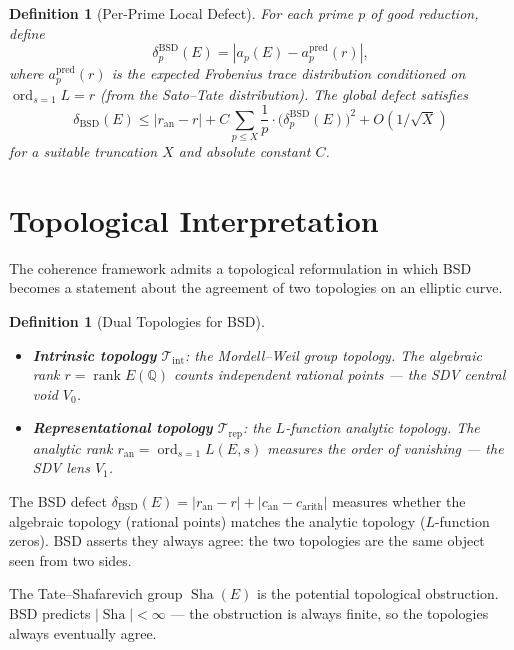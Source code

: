 \documentclass[11pt]{article}
\newtheorem{definition}[theorem]{Definition}
\DeclareMathOperator{\ord}{ord}
\DeclareMathOperator{\Sha}{Sha}
\begin{document}
\begin{definition}[Per-Prime Local Defect]
\label{def:local-defect}
For each prime $p$ of good reduction, define
\[
  \delta_p^{\mathrm{BSD}}(E) =
  |a_p(E) - a_p^{\mathrm{pred}}(r)|,
\]
where $a_p^{\mathrm{pred}}(r)$ is the expected Frobenius trace distribution
conditioned on $\ord_{s=1} L = r$ (from the Sato--Tate distribution).  The
global defect satisfies
\[
  \delta_{\mathrm{BSD}}(E) \leq
  |r_{\mathrm{an}} - r| +
  C \sum_{p \leq X} \frac{1}{p} \cdot \bigl(\delta_p^{\mathrm{BSD}}(E)\bigr)^2
  + O(1/\sqrt{X})
\]
for a suitable truncation $X$ and absolute constant $C$.
\end{definition}

\section{Topological Interpretation}
\label{sec:topology}

The coherence framework admits a topological reformulation in which BSD
becomes a statement about the agreement of two topologies on an elliptic
curve.

\begin{definition}[Dual Topologies for BSD]
\label{def:bsd-topo}
\mbox{}
\begin{itemize}
\item \textbf{Intrinsic topology} $\mathcal{T}_{\mathrm{int}}$:
the Mordell--Weil group topology.  The algebraic rank $r = \operatorname{rank}
E(\mathbb{Q})$ counts independent rational points --- the SDV central
void $V_0$.
\item \textbf{Representational topology} $\mathcal{T}_{\mathrm{rep}}$:
the $L$-function analytic topology.  The analytic rank $r_{\mathrm{an}} =
\operatorname{ord}_{s=1} L(E,s)$ measures the order of vanishing --- the
SDV lens $V_1$.
\end{itemize}
\end{definition}

\noindent
The BSD defect $\delta_{\mathrm{BSD}}(E) = |r_{\mathrm{an}} - r| +
|c_{\mathrm{an}} - c_{\mathrm{arith}}|$ measures whether the algebraic
topology (rational points) matches the analytic topology ($L$-function
zeros).  BSD asserts they always agree: the two topologies are the
same object seen from two sides.

The Tate--Shafarevich group $\Sha(E)$ is the potential topological
obstruction.  BSD predicts $|\Sha| < \infty$ --- the obstruction is
always finite, so the topologies always eventually agree.
\end{document}
